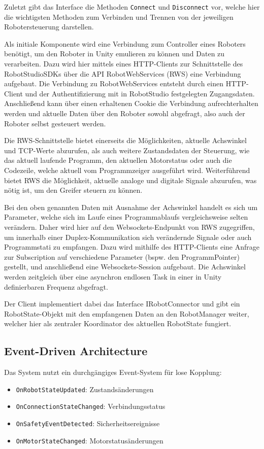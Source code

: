 Zuletzt gibt das Interface die Methoden \texttt{Connect} und
\texttt{Disconnect}
vor, welche hier die wichtigsten Methoden zum Verbinden und
Trennen von der jeweiligen Robotersteuerung darstellen.

Als initiale Komponente wird eine Verbindung zum
Controller eines Roboters benötigt, um den Roboter in Unity emulieren zu können
und Daten zu verarbeiten. Dazu wird hier mittels eines HTTP-Clients zur
Schnittstelle des RobotStudioSDKs über die API RobotWebServices (RWS) eine
Verbindung aufgebaut. Die Verbindung zu RobotWebServices entsteht durch einen
HTTP-Client und der Authentifizierung mit in RobotStudio festgelegten
Zugangsdaten. Anschließend kann über einen erhaltenen Cookie die Verbindung
aufrechterhalten werden und aktuelle Daten über den Roboter sowohl abgefragt,
also auch der Roboter selbst gesteuert werden.

Die RWS-Schnittstelle bietet einerseits die Möglichkeiten,
aktuelle Achswinkel und TCP-Werte abzurufen, als auch
weitere Zustandsdaten der Steuerung, wie das aktuell laufende
Programm, den aktuellen Motorstatus
oder auch die Codezeile, welche aktuell vom Programmzeiger ausgeführt wird.
Weiterführend bietet RWS die Möglichkeit, aktuelle analoge und digitale
Signale abzurufen, was nötig ist, um den Greifer steuern zu können.

Bei den oben genannten Daten mit Ausnahme der Achswinkel handelt es sich um
Parameter, welche sich im Laufe eines Programmablaufs vergleichsweise selten
verändern. Daher wird hier auf den Websockets-Endpunkt von RWS zugegriffen, um
innerhalb einer Duplex-Kommunikation sich verändernde Signale oder auch
Programmstati zu empfangen. Dazu wird mithilfe des HTTP-Clients eine Anfrage zur
Subscription auf verschiedene Parameter (bspw. den ProgrammPointer) gestellt,
und anschließend eine Websockets-Session aufgebaut. Die Achswinkel werden
zeitgleich über eine asynchron endlosen Task in einer in Unity definierbaren
Frequenz abgefragt.

Der Client implementiert dabei das Interface IRobotConnector und gibt ein
RobotState-Objekt mit den empfangenen Daten an den RobotManager
weiter, welcher hier
als zentraler Koordinator des aktuellen RobotState fungiert.

\subsection{Event-Driven Architecture}
Das System nutzt ein durchgängiges Event-System für lose Kopplung:
\begin{itemize}
  \item \texttt{OnRobotStateUpdated}: Zustandsänderungen
  \item \texttt{OnConnectionStateChanged}: Verbindungsstatus
  \item \texttt{OnSafetyEventDetected}: Sicherheitsereignisse
  \item \texttt{OnMotorStateChanged}: Motorstatusänderungen
\end{itemize}

